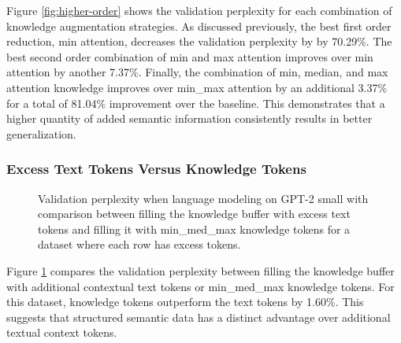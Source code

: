 \documentclass[phd,electronic,oneside,twosidetoc,letterpaper,chaptercenter,parttop,lof]{byumsphd}
\begin{document}
Figure \ref{fig:higher-order} shows the validation perplexity for each combination of knowledge augmentation strategies. 
As discussed previously, the best first order reduction, min attention,  decreases the validation perplexity by by 70.29\%.
The best second order combination of min and max attention improves over min attention by another 7.37\%.
Finally, the combination of min, median, and max attention knowledge improves over min\_max attention by an additional 3.37\% for a total of 81.04\% improvement over the baseline.
This demonstrates that a higher quantity of added semantic information consistently results in better generalization.

\subsubsection{Excess Text Tokens Versus Knowledge Tokens}

\begin{figure}
\centering
{}  
    \caption[Excess Text vs. Knowledge]{
        Validation perplexity when language modeling on GPT-2 small with comparison between filling the knowledge buffer with excess text tokens and filling it with min\_med\_max knowledge tokens for a dataset where each row has excess tokens.
    }
    \label{fig:text-knowledge-baseline-chart}
\end{figure}

Figure \ref{fig:text-knowledge-baseline-chart} compares the validation perplexity between filling the knowledge buffer with additional contextual text tokens or min\_med\_max knowledge tokens.
For this dataset, knowledge tokens outperform the text tokens by 1.60\%.
This suggests that structured semantic data has a distinct advantage over additional textual context tokens. 
\end{document}
